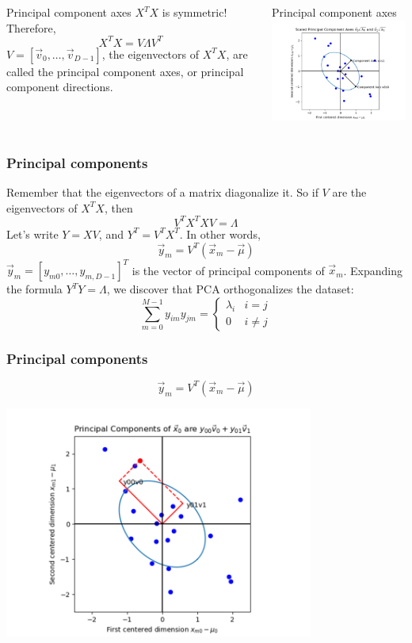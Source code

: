 \documentclass{beamer}
\begin{document}
\begin{frame}
  \begin{columns}
    \column{1.75in}
    \begin{block}{Principal component axes}
      $X^TX$ is symmetric!  Therefore,
      \[
      X^TX=V\Lambda V^T
      \]
      $V=[\vec{v}_0,\ldots,\vec{v}_{D-1}]$, the eigenvectors
      of $X^TX$, are called the principal component axes,
      or principal component directions.
    \end{block}
    \column{2.625in}
    \begin{block}{Principal component axes}
      \includegraphics[width=2.5in]{principal_component_axes.png}
    \end{block}
  \end{columns}
\end{frame}

\begin{frame}
  \frametitle{Principal components}
  Remember that the eigenvectors of a matrix diagonalize it.
  So if $V$ are the eigenvectors of $X^TX$, then
  \[
  V^TX^TXV=\Lambda
  \]
  Let's write $Y=XV$, and $Y^T=V^TX^T$.  In other words,
  \[
  \vec{y}_m=V^T(\vec{x}_m-\vec\mu)
  \]
  $\vec{y}_m=[y_{m0},\ldots,y_{m,D-1}]^T$ is the vector of
  principal components of $\vec{x}_m$.  Expanding the formula
  $Y^TY=\Lambda$, we discover that PCA orthogonalizes the dataset:
  \[
  \sum_{m=0}^{M-1}y_{im}y_{jm}=\begin{cases}
  \lambda_i & i=j\\0&i\ne j
  \end{cases}
  \]
\end{frame}

\begin{frame}
  \frametitle{Principal components}
  \[
  \vec{y}_m=V^T(\vec{x}_m-\vec\mu)
  \]
  \centerline{\includegraphics[height=3in]{principal_components.png}}
\end{frame}
\end{document}
